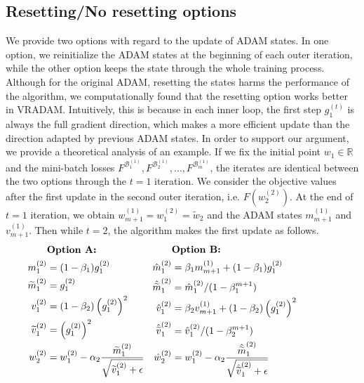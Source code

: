 \documentclass[twoside]{article}
\def\RR{\mathbb{R}}
\def\BB{\mathcal{B}}
\begin{document}
\subsection{Resetting/No resetting options}
We provide two options with regard to the update of ADAM states. In one option, we reinitialize the ADAM states at the beginning of each outer iteration, while the other option keeps the state through the whole training process. Although for the original ADAM, resetting the states harms the performance of the algorithm, we computationally found that the resetting option works better in VRADAM. Intuitively, this is because in each inner loop, the first step $g_1^{(t)}$ is always the full gradient direction, which makes a more efficient update than the direction adapted by previous ADAM states. In order to support our argument, we provide a theoretical analysis of an example. If we fix the initial point $w_1\in\RR$ and the mini-batch losses $F^{\BB_1^{(1)}}, F^{\BB_2^{(1)}},\ldots, F^{\BB_m^{(1)}}$, the iterates are identical between the two options through the $t=1$ iteration. We consider the objective values after the first update in the second outer iteration, i.e. $F\left(w_2^{(2)}\right)$. At the end of $t=1$ iteration, we obtain $w_{m+1}^{(1)} = w_1^{(2)}=\tilde w_2$ and the ADAM states $m_{m+1}^{(1)}$ and $v_{m+1}^{(1)}$. Then while $t=2$, the algorithm makes the first update as follows.
\begin{equation*}
\hspace{-1.5cm}
    \begin{split}
    &\textbf{Option A:}\\
        m^{(2)}_1 &= (1-\beta_1) g^{(2)}_1\\
        \widetilde m^{(2)}_1 &= g^{(2)}_1\\
        v^{(2)}_1 &= (1-\beta_2) \left(g^{(2)}_1\right)^2\\ \widetilde v^{(2)}_1 &= \left(g^{(2)}_1\right)^2\\
        w^{(2)}_2 &= w^{(2)}_1 - \alpha_2 \frac{\widetilde m^{(2)}_1}{\sqrt{\widetilde v^{(2)}_1 + \epsilon}}
    \end{split}
    \hspace{0.3cm}
    \begin{split}
    &\textbf{Option B:}\\
        \hat m^{(2)}_1 &=\beta_1 m^{(1)}_{m+1} + (1-\beta_1) g^{(2)}_1\\
        \hat{ \widetilde m}^{(2)}_1 &= \hat m^{(2)}_1 / (1-\beta_1^{m+1}) \\
        \hat v^{(2)}_1&= \beta_2 v^{(1)}_{m+1} + (1-\beta_2)\left( g^{(2)}_1\right)^2\\
        \hat{ \widetilde v}_1^{(2)} &= \hat v_1^{(2)}/(1-\beta_2^{m+1}) \\
        \hat w_2^{(2)} &=  w^{(2)}_1 - \alpha_2 \frac{ \hat{\widetilde m}^{(2)}_1}{\sqrt{\hat{\widetilde v}_1^{(2)}+\epsilon}}
    \end{split}
\end{equation*}
\end{document}
